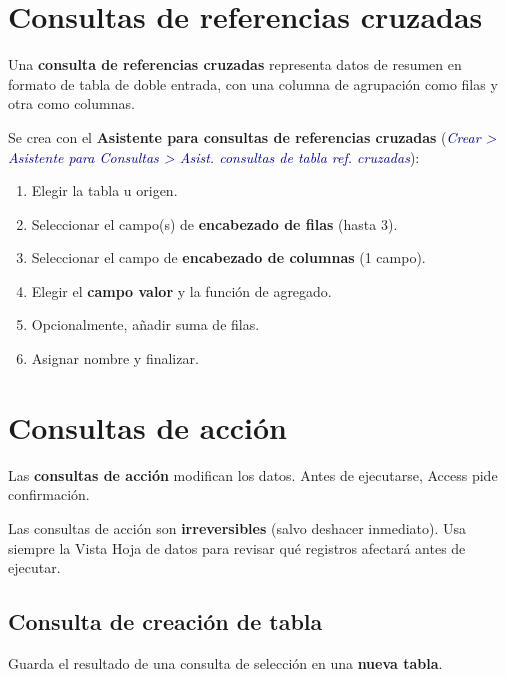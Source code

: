 \documentclass[12pt,a4paper]{article}
\newcommand{\menu}[1]{\textit{\textcolor{darkblue}{#1}}}
\begin{document}
\section{Consultas de referencias cruzadas}

Una \textbf{consulta de referencias cruzadas} representa datos de resumen en formato de tabla de doble entrada, con una columna de agrupación como filas y otra como columnas.

Se crea con el \textbf{Asistente para consultas de referencias cruzadas} (\menu{Crear > Asistente para Consultas > Asist. consultas de tabla ref. cruzadas}):

\begin{enumerate}
  \item Elegir la tabla u origen.
  \item Seleccionar el campo(s) de \textbf{encabezado de filas} (hasta 3).
  \item Seleccionar el campo de \textbf{encabezado de columnas} (1 campo).
  \item Elegir el \textbf{campo valor} y la función de agregado.
  \item Opcionalmente, añadir suma de filas.
  \item Asignar nombre y finalizar.
\end{enumerate}

\section{Consultas de acción}

Las \textbf{consultas de acción} modifican los datos. Antes de ejecutarse, Access pide confirmación.

\begin{importante}
Las consultas de acción son \textbf{irreversibles} (salvo deshacer inmediato). Usa siempre la Vista Hoja de datos para revisar qué registros afectará antes de ejecutar.
\end{importante}

\subsection{Consulta de creación de tabla}

Guarda el resultado de una consulta de selección en una \textbf{nueva tabla}.
\end{document}
